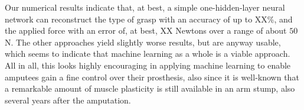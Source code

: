 Our numerical results indicate that, at best, a simple
one-hidden-layer neural network can reconstruct the type of grasp with
an accuracy of up to XX\%, and the applied force with an error of, at
best, XX Newtons over a range of about $50$N. The other approaches
yield slightly worse results, but are anyway usable, which seems to
indicate that machine learning as a whole is a viable approach.  All
in all, this looks highly encouraging in applying machine learning to
enable amputees gain a fine control over their prosthesis, also since
it is well-known \cite{...} that a remarkable amount of muscle
plasticity is still available in an arm stump, also several years
after the amputation.
